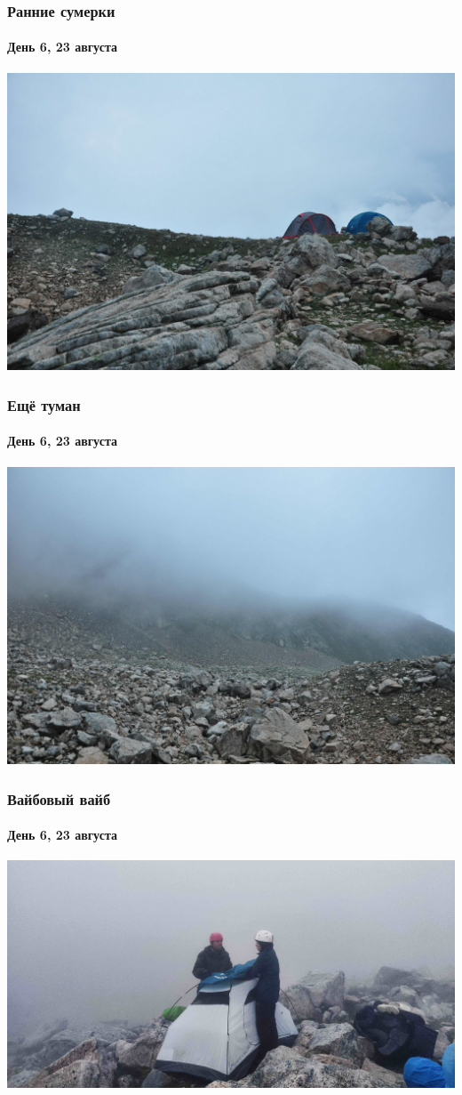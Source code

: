 \begin{frame}
	\frametitle{Ранние сумерки}
	\framesubtitle{День 6, 23 августа}
	\centering
	\includegraphics[width=\textwidth]{../pics/DSC_0094}			
\end{frame}

\begin{frame}
	\frametitle{Ещё туман}
	\framesubtitle{День 6, 23 августа}
	\centering
	\includegraphics[width=\textwidth]{../pics/DSC_0095}			
\end{frame}

\begin{frame}
	\frametitle{Вайбовый вайб}
	\framesubtitle{День 6, 23 августа}
	\centering
	\includegraphics[width=\textwidth]{../pics/IMG_20240823_184041}			
\end{frame}

